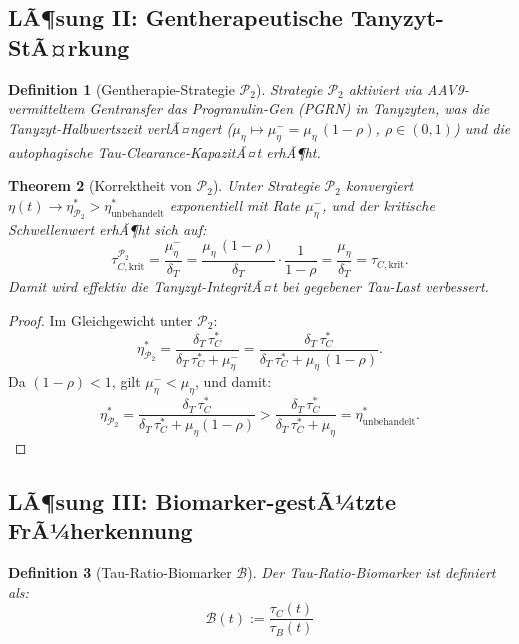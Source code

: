 ﻿\documentclass[12pt,a4paper]{article}
\newtheorem{theorem}{Theorem}[section]
\newtheorem{definition}[theorem]{Definition}
\theoremstyle{definition}
\begin{document}
	\subsection{LÃ¶sung II: Gentherapeutische Tanyzyt-StÃ¤rkung}
	
	\begin{definition}[Gentherapie-Strategie $\mathcal{P}_2$]
		Strategie $\mathcal{P}_2$ aktiviert via AAV9-vermitteltem Gentransfer das Progranulin-Gen (PGRN) in Tanyzyten, was die Tanyzyt-Halbwertszeit verlÃ¤ngert ($\mu_\eta \mapsto \mu_\eta^- = \mu_\eta\,(1-\rho)$, $\rho \in (0,1)$) und die autophagische Tau-Clearance-KapazitÃ¤t erhÃ¶ht.
	\end{definition}
	
	\begin{theorem}[Korrektheit von $\mathcal{P}_2$]
		\label{thm:p2_korrektheit}
		Unter Strategie $\mathcal{P}_2$ konvergiert $\eta(t) \to \eta_{\mathcal{P}_2}^* > \eta^*_{\text{unbehandelt}}$ exponentiell mit Rate $\mu_\eta^-$, und der kritische Schwellenwert erhÃ¶ht sich auf:
		\[
		\tau_{C,\text{krit}}^{\mathcal{P}_2} = \frac{\mu_\eta^-}{\delta_T} = \frac{\mu_\eta\,(1-\rho)}{\delta_T} \cdot \frac{1}{1-\rho} = \frac{\mu_\eta}{\delta_T} = \tau_{C,\text{krit}}.
		\]
		Damit wird effektiv die Tanyzyt-IntegritÃ¤t bei gegebener Tau-Last verbessert.
	\end{theorem}
	
	\begin{proof}
		Im Gleichgewicht unter $\mathcal{P}_2$:
		\[
		\eta_{\mathcal{P}_2}^* = \frac{\delta_T\,\tau_C^*}{\delta_T\,\tau_C^* + \mu_\eta^-} = \frac{\delta_T\,\tau_C^*}{\delta_T\,\tau_C^* + \mu_\eta\,(1-\rho)}.
		\]
		Da $(1-\rho) < 1$, gilt $\mu_\eta^- < \mu_\eta$, und damit:
		\[
		\eta_{\mathcal{P}_2}^* = \frac{\delta_T\,\tau_C^*}{\delta_T\,\tau_C^* + \mu_\eta(1-\rho)} > \frac{\delta_T\,\tau_C^*}{\delta_T\,\tau_C^* + \mu_\eta} = \eta^*_{\text{unbehandelt}}.
		\]
	\end{proof}
	
	\subsection{LÃ¶sung III: Biomarker-gestÃ¼tzte FrÃ¼herkennung}
	
	\begin{definition}[Tau-Ratio-Biomarker $\mathcal{B}$]
		Der \emph{Tau-Ratio-Biomarker} ist definiert als:
		\[
		\mathcal{B}(t) := \frac{\tau_C(t)}{\tau_B(t)}
		\]
	\end{definition}
	
\end{document}
